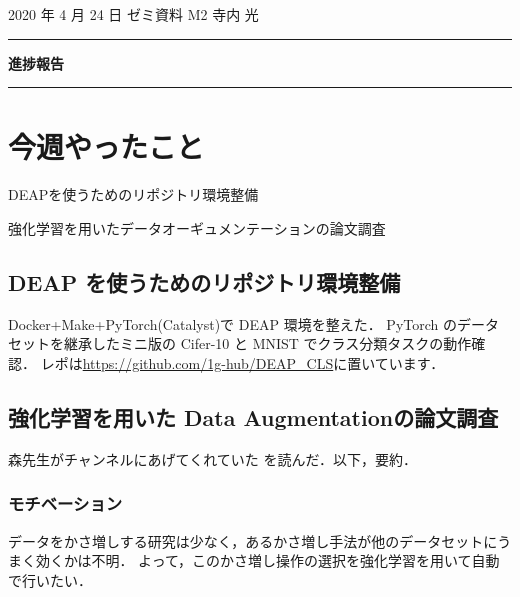 \documentclass[onecolumn]{ujarticle}   %
\begin{document}
	\noindent

	\hspace{1em}
	2020 年 4 月 24 日
	ゼミ資料
	\hfill
	M2 寺内 光

	\vspace{2mm}

	\hrule

	\begin{center}
		{\Large \bf 進捗報告}
	\end{center}


	\hrule
	\vspace{3mm}

	\section{今週やったこと}
	\begin{itemize}{
		\item{DEAPを使うためのリポジトリ環境整備}
		\item{強化学習を用いたデータオーギュメンテーションの論文調査}
	}\end{itemize}
	\subsection{DEAP を使うためのリポジトリ環境整備}
	Docker+Make+PyTorch(Catalyst)で DEAP 環境を整えた．
	PyTorch のデータセットを継承したミニ版の Cifer-10 と MNIST でクラス分類タスクの動作確認．
	レポは\url{https://github.com/1g-hub/DEAP_CLS}に置いています．


	\subsection{強化学習を用いた Data Augmentationの論文調査}
	森先生がチャンネルにあげてくれていた \cite{8953317} を読んだ．以下，要約．
	\subsubsection{モチベーション}
	データをかさ増しする研究は少なく，あるかさ増し手法が他のデータセットにうまく効くかは不明．
	よって，このかさ増し操作の選択を強化学習を用いて自動で行いたい．
\end{document}
